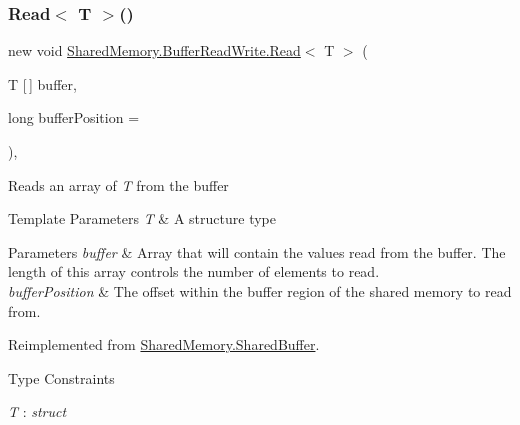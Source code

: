 \subsubsection{\texorpdfstring{Read$<$ T $>$()}{Read< T >()}\hspace{0.1cm}{\footnotesize\ttfamily [2/2]}}
{\footnotesize\ttfamily new void \hyperlink{class_shared_memory_1_1_buffer_read_write_a5d187c340e0f342a2f1be07d4f9957f7}{Shared\+Memory.\+Buffer\+Read\+Write.\+Read}$<$ T $>$ (\begin{DoxyParamCaption}\item[{T \mbox{[}$\,$\mbox{]}}]{buffer,  }\item[{long}]{buffer\+Position = {} }\end{DoxyParamCaption})\hspace{0.3cm}{\ttfamily [inline]}, {\ttfamily [virtual]}}



Reads an array of {\itshape T}  from the buffer 


\begin{DoxyTemplParams}{Template Parameters}
{\em T} & A structure type\\
\hline
\end{DoxyTemplParams}

\begin{DoxyParams}{Parameters}
{\em buffer} & Array that will contain the values read from the buffer. The length of this array controls the number of elements to read.\\
\hline
{\em buffer\+Position} & The offset within the buffer region of the shared memory to read from.\\
\hline
\end{DoxyParams}


Reimplemented from \hyperlink{class_shared_memory_1_1_shared_buffer_aba5489c699f444012792fd6331affb03}{Shared\+Memory.\+Shared\+Buffer}.

\begin{Desc}
\item[Type Constraints]\begin{description}
\item[{\em T} : {\em struct}]\end{description}
\end{Desc}
\mbox{\label{class_shared_memory_1_1_buffer_read_write_afc484df280665f9d63ae28a21e46988d}} 
